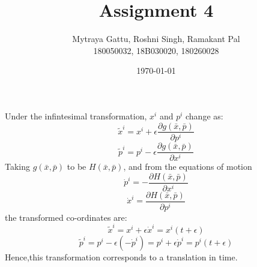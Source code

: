 \documentclass{article}
\title{Assignment 4}
\author{Mytraya Gattu, Roshni Singh, Ramakant Pal\\ 180050032, 18B030020, 180260028}
\date{\today}
\begin{document}
\maketitle
Under the infintesimal transformation, $x^{i}$ and $p^{i}$ change as:
$$\tilde{x}^{i}=x^{i}+\epsilon \frac{\partial g(\bar{x},\bar{p})}{\partial p^{i}}$$
$$\tilde{p}^{i}=p^{i}-\epsilon \frac{\partial g(\bar{x},\bar{p})}{\partial x^{i}}$$
Taking $g(\bar{x},\bar{p})$ to be $H(\bar{x},\bar{p})$, and from the equations of motion
$$\dot{p}^{i} = -\frac{\partial H(\bar{x},\bar{p})}{\partial x^{i}}$$
$$\dot{x}^{i} = \frac{\partial H(\bar{x},\bar{p})}{\partial p^{i}}$$
the transformed co-ordinates are:
$$\tilde{x}^{i}=x^{i}+\epsilon \dot{x}^{i} = x^{i}(t + \epsilon)$$
$$\tilde{p}^{i}=p^{i}-\epsilon \left(-\dot{p}^{i}\right) = p^{i}+\epsilon \dot{p}^{i} = p^{i}(t+\epsilon)$$
Hence,this transformation corresponds to a translation in time. 
\end{document}
